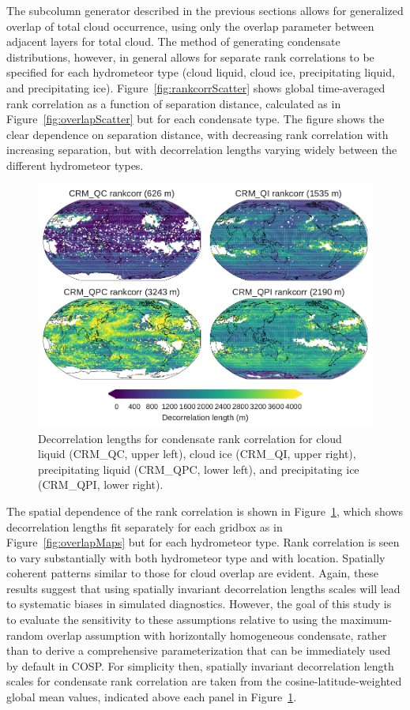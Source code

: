 The subcolumn generator described in the previous sections allows for
generalized overlap of total cloud occurrence, using only the overlap
parameter between adjacent layers for total cloud. The method of
generating condensate distributions, however, in general allows for
separate rank correlations to be specified for each hydrometeor type
(cloud liquid, cloud ice, precipitating liquid, and precipitating ice).
Figure~\ref{fig:rankcorrScatter} shows global time-averaged rank
correlation as a function of separation distance, calculated as in
Figure~\ref{fig:overlapScatter} but for each condensate type. The figure
shows the clear dependence on separation distance, with decreasing rank
correlation with increasing separation, but with decorrelation lengths
varying widely between the different hydrometeor types.

\begin{figure}[htbp]
\centering
\includegraphics{graphics/subgrid2_rankcorr_maps.pdf}
\caption{\label{fig:rankcorrMaps}Decorrelation lengths for condensate
rank correlation for cloud liquid (CRM\_QC, upper left), cloud ice
(CRM\_QI, upper right), precipitating liquid (CRM\_QPC, lower left), and
precipitating ice (CRM\_QPI, lower right).}\label{fig:rankcorrMaps}
\end{figure}

The spatial dependence of the rank correlation is shown in
Figure~\ref{fig:rankcorrMaps}, which shows decorrelation lengths fit
separately for each gridbox as in Figure~\ref{fig:overlapMaps} but for
each hydrometeor type. Rank correlation is seen to vary substantially
with both hydrometeor type and with location. Spatially coherent
patterns similar to those for cloud overlap are evident. Again, these
results suggest that using spatially invariant decorrelation lengths
scales will lead to systematic biases in simulated diagnostics. However,
the goal of this study is to evaluate the sensitivity to these
assumptions relative to using the maximum-random overlap assumption with
horizontally homogeneous condensate, rather than to derive a
comprehensive parameterization that can be immediately used by default
in COSP. For simplicity then, spatially invariant decorrelation length
scales for condensate rank correlation are taken from the
cosine-latitude-weighted global mean values, indicated above each panel
in Figure~\ref{fig:rankcorrMaps}.

